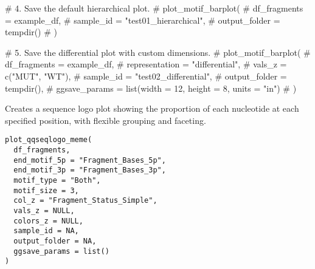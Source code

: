 \documentclass[a4paper]{book}
\begin{document}
\begin{Examples}
\begin{ExampleCode}
# 4. Save the default hierarchical plot.
# plot_motif_barplot(
#   df_fragments = example_df,
#   sample_id = "test01_hierarchical",
#   output_folder = tempdir()
# )

# 5. Save the differential plot with custom dimensions.
# plot_motif_barplot(
#   df_fragments = example_df,
#   representation = "differential",
#   vals_z = c("MUT", "WT"),
#   sample_id = "test02_differential",
#   output_folder = tempdir(),
#   ggsave_params = list(width = 12, height = 8, units = "in")
# )

\end{ExampleCode}
\end{Examples}
%
\begin{Description}
Creates a sequence logo plot showing the proportion of each nucleotide at each specified position, with flexible
grouping and faceting.
\end{Description}
%
\begin{Usage}
\begin{verbatim}
plot_qqseqlogo_meme(
  df_fragments,
  end_motif_5p = "Fragment_Bases_5p",
  end_motif_3p = "Fragment_Bases_3p",
  motif_type = "Both",
  motif_size = 3,
  col_z = "Fragment_Status_Simple",
  vals_z = NULL,
  colors_z = NULL,
  sample_id = NA,
  output_folder = NA,
  ggsave_params = list()
)
\end{verbatim}
\end{Usage}
%
\end{document}
